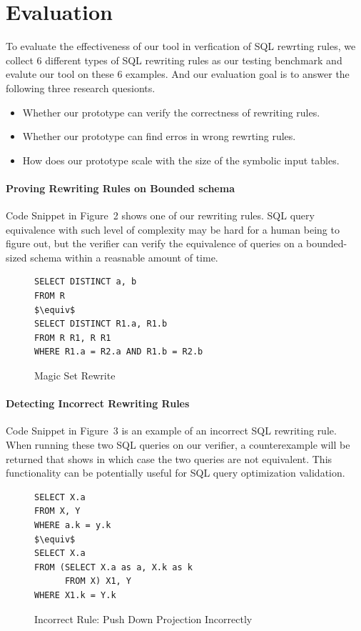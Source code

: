 \section{Evaluation}
\label{sec:eval}
To evaluate the effectiveness of our tool in verfication of SQL rewrting rules, we collect 6 different types of SQL rewriting rules as our testing benchmark and evalute our tool on these 6 examples. And our evaluation goal is to answer the following three research quesionts.
\begin{itemize}\itemsep0pt
\item Whether our prototype can verify the correctness of rewriting rules.
\item Whether our prototype can find erros in wrong rewrting rules.
\item How does our prototype scale with the size of the symbolic input tables.
\end{itemize}

\paragraph{Proving Rewriting Rules on Bounded schema}
Code Snippet in Figure~2 shows one of our rewriting rules. 
SQL query equivalence with such level of complexity may be hard for a human being to 
figure out, but the verifier can verify the equivalence of queries on a bounded-sized 
schema within a reasnable amount of time.

\begin{figure}
\label{fig:magic}
\begin{lstlisting}[style=sql,xleftmargin=.3\textwidth,mathescape=true]
SELECT DISTINCT a, b
FROM R
$\equiv$
SELECT DISTINCT R1.a, R1.b
FROM R R1, R R1
WHERE R1.a = R2.a AND R1.b = R2.b
\end{lstlisting}
\caption{Magic Set Rewrite}
\end{figure}

\paragraph{Detecting Incorrect Rewriting Rules}
Code Snippet in Figure~3 is an example 
of an incorrect SQL rewriting rule.
When running these two SQL queries on our verifier, a counterexample will be returned that
shows in which case the two queries are not equivalent.
This functionality can be potentially useful for SQL query optimization validation.

\begin{figure}
\label{fig:push-proj}
\begin{lstlisting}[style=sql,xleftmargin=.3\textwidth,mathescape=true]
SELECT X.a
FROM X, Y
WHERE a.k = y.k
$\equiv$
SELECT X.a
FROM (SELECT X.a as a, X.k as k
      FROM X) X1, Y
WHERE X1.k = Y.k
\end{lstlisting}
\caption{Incorrect Rule: Push Down Projection Incorrectly}
\end{figure}

